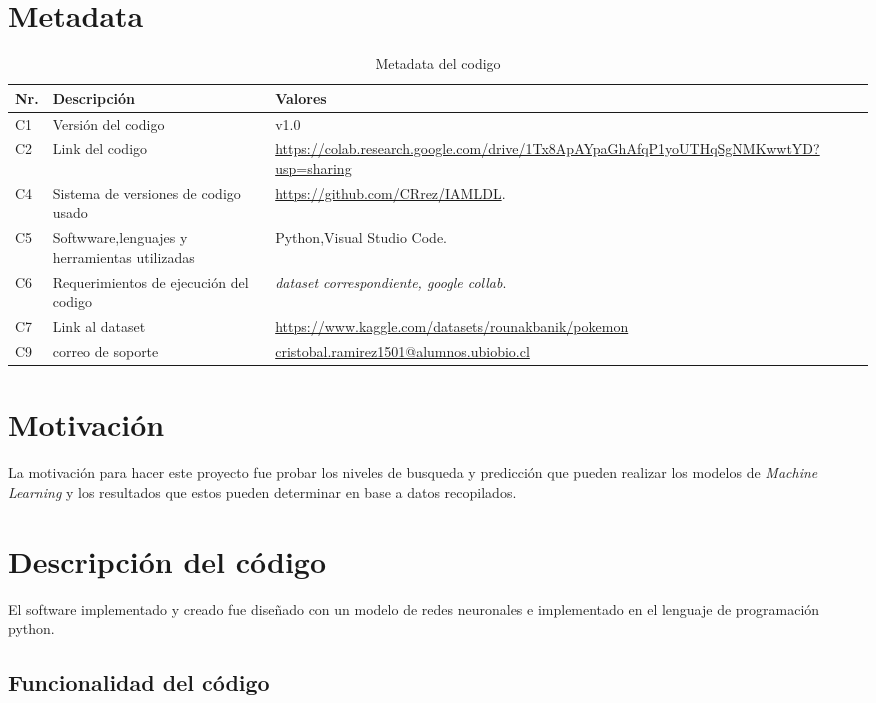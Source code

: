 \documentclass[]{elsarticle}
\begin{document}

\section*{Metadata}


\begin{table}[!h]
\begin{tabular}{|l|p{6.5cm}|p{6.5cm}|}
\hline
\textbf{Nr.} & \textbf{Descripción} & \textbf{Valores} \\
\hline
C1 &Versión del codigo & v1.0 \\
\hline
C2 & Link del codigo & \url{https://colab.research.google.com/drive/1Tx8ApAYpaGhAfqP1yoUTHqSgNMKwwtYD?usp=sharing} \\
\hline
C4 & Sistema de versiones de codigo usado & \url{https://github.com/CRrez/IAMLDL}. \\
\hline
    C5 & Softwware,lenguajes y herramientas utilizadas & Python,Visual Studio Code. \\
\hline
C6 & Requerimientos de ejecución del codigo & \textit{dataset correspondiente, google collab}.\\
\hline
C7 & Link al dataset & \url{https://www.kaggle.com/datasets/rounakbanik/pokemon} \\
\hline
C9 & correo de soporte & \url{cristobal.ramirez1501@alumnos.ubiobio.cl}\\
\hline
\end{tabular}
\caption{Metadata del codigo}
\label{codeMetadata} 
\end{table}






\section{Motivación}
La motivación para hacer este proyecto fue probar los niveles de busqueda y predicción que pueden realizar los modelos de \textit{Machine Learning} y los resultados que estos pueden determinar en base a datos recopilados.

\section{Descripción del código}

El software implementado y creado fue diseñado con un modelo de redes neuronales  e implementado en el lenguaje de programación python.


 \subsection{Funcionalidad del código}
\end{document}
